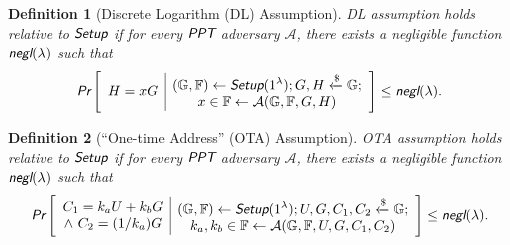 \documentclass{article}
\newtheorem{definition}{Definition}[section]
\begin{document}
\begin{definition}[Discrete Logarithm (DL) Assumption]
DL assumption holds relative to $\emph{\textsf{Setup}}$ if for every $\emph{\textsf{PPT}}$ adversary $\mathcal{A}$, there exists a negligible function $\emph{\textsf{negl}}(\lambda)$ such that
\begin{align*}
\emph{\textsf{Pr}}\left[
\begin{array}{c|c}
    \begin{gathered}
        H = xG
    \end{gathered}
    &
    \begin{gathered}
        (\mathbb{G}, \mathbb{F})\leftarrow\emph{\textsf{Setup}}(1^{\lambda}); G,H\xleftarrow{\$}\mathbb{G}; \\
        x\in\mathbb{F}\leftarrow\mathcal{A}(\mathbb{G}, \mathbb{F}, G, H) \\
    \end{gathered}
\end{array}
\right]
\le \emph{\textsf{negl}}(\lambda).
\end{align*}
\end{definition}

\begin{definition}[``One-time Address'' (OTA) Assumption]
OTA assumption holds relative to $\emph{\textsf{Setup}}$ if for every $\emph{\textsf{PPT}}$ adversary $\mathcal{A}$, there exists a negligible function $\emph{\textsf{negl}}(\lambda)$ such that
\begin{align*}
\emph{\textsf{Pr}}\left[
\begin{array}{c|c}
    \begin{gathered}
        C_1 = k_a U + k_b G \\
        \wedge\ C_2 = (1/k_a)G
    \end{gathered}
    &
    \begin{gathered}
        (\mathbb{G}, \mathbb{F})\leftarrow\emph{\textsf{Setup}}(1^{\lambda}); U,G,C_1,C_2\xleftarrow{\$}\mathbb{G}; \\
        k_a, k_b\in\mathbb{F}\leftarrow\mathcal{A}(\mathbb{G}, \mathbb{F}, U, G, C_1, C_2) \\
    \end{gathered}
\end{array}
\right]
\le \emph{\textsf{negl}}(\lambda).
\end{align*}
\end{definition}
\end{document}
